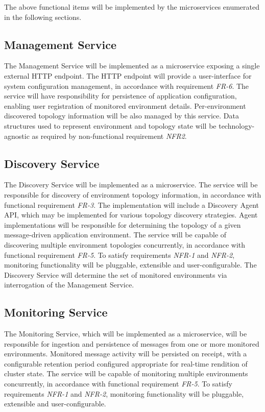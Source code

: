 The above functional items will be implemented by the microservices enumerated in the following sections.


\subsection{Management Service}

The Management Service will be implemented as a microservice exposing a single external HTTP endpoint. The HTTP endpoint will provide a user-interface for system configuration management, in accordance with requirement \textit{FR-6}. The service will have responsibility for persistence of  application configuration, enabling user registration of monitored environment details. Per-environment discovered topology information will be also managed by this service. Data structures used to represent environment and topology state will be technology-agnostic as required by non-functional requirement \textit{NFR2}.

\subsection{Discovery Service}

The Discovery Service will be implemented as a microservice. The service will be responsible for discovery of environment topology information, in accordance with functional requirement \textit{FR-3}. The implementation will include a Discovery Agent API, which may be implemented for various topology discovery strategies. Agent implementations will be responsible for determining the topology of a given message-driven application environment. The service will be capable of discovering multiple environment topologies concurrently, in accordance with functional requirement \textit{FR-5}. To satisfy requirements \textit{NFR-1 }and \textit{NFR-2}, monitoring functionality will be pluggable, extensible and user-configurable. The Discovery Service will determine the set of monitored environments via interrogation of the Management Service.

\subsection{Monitoring Service}
The Monitoring Service, which will be implemented as a microservice, will be responsible for ingestion and persistence of messages from one or more monitored environments. Monitored message activity will be persisted on receipt, with a configurable retention period configured appropriate for real-time rendition of cluster state. The service will be capable of monitoring multiple environments concurrently, in accordance with functional requirement \textit{FR-5}. To satisfy requirements \textit{NFR-1 }and \textit{NFR-2}, monitoring functionality will be pluggable, extensible and user-configurable.

